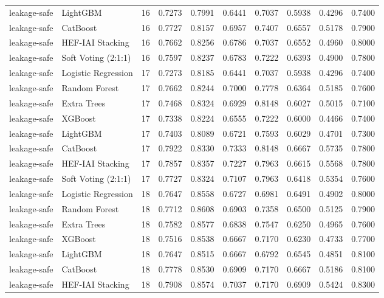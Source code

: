 \begin{tabular}{llrrrrrrrr}
leakage-safe & LightGBM & 16 & 0.7273 & 0.7991 & 0.6441 & 0.7037 & 0.5938 & 0.4296 & 0.7400 \\
leakage-safe & CatBoost & 16 & 0.7727 & 0.8157 & 0.6957 & 0.7407 & 0.6557 & 0.5178 & 0.7900 \\
leakage-safe & HEF-IAI Stacking & 16 & 0.7662 & 0.8256 & 0.6786 & 0.7037 & 0.6552 & 0.4960 & 0.8000 \\
leakage-safe & Soft Voting (2:1:1) & 16 & 0.7597 & 0.8237 & 0.6783 & 0.7222 & 0.6393 & 0.4900 & 0.7800 \\
leakage-safe & Logistic Regression & 17 & 0.7273 & 0.8185 & 0.6441 & 0.7037 & 0.5938 & 0.4296 & 0.7400 \\
leakage-safe & Random Forest & 17 & 0.7662 & 0.8244 & 0.7000 & 0.7778 & 0.6364 & 0.5185 & 0.7600 \\
leakage-safe & Extra Trees & 17 & 0.7468 & 0.8324 & 0.6929 & 0.8148 & 0.6027 & 0.5015 & 0.7100 \\
leakage-safe & XGBoost & 17 & 0.7338 & 0.8224 & 0.6555 & 0.7222 & 0.6000 & 0.4466 & 0.7400 \\
leakage-safe & LightGBM & 17 & 0.7403 & 0.8089 & 0.6721 & 0.7593 & 0.6029 & 0.4701 & 0.7300 \\
leakage-safe & CatBoost & 17 & 0.7922 & 0.8330 & 0.7333 & 0.8148 & 0.6667 & 0.5735 & 0.7800 \\
leakage-safe & HEF-IAI Stacking & 17 & 0.7857 & 0.8357 & 0.7227 & 0.7963 & 0.6615 & 0.5568 & 0.7800 \\
leakage-safe & Soft Voting (2:1:1) & 17 & 0.7727 & 0.8324 & 0.7107 & 0.7963 & 0.6418 & 0.5354 & 0.7600 \\
leakage-safe & Logistic Regression & 18 & 0.7647 & 0.8558 & 0.6727 & 0.6981 & 0.6491 & 0.4902 & 0.8000 \\
leakage-safe & Random Forest & 18 & 0.7712 & 0.8608 & 0.6903 & 0.7358 & 0.6500 & 0.5125 & 0.7900 \\
leakage-safe & Extra Trees & 18 & 0.7582 & 0.8577 & 0.6838 & 0.7547 & 0.6250 & 0.4965 & 0.7600 \\
leakage-safe & XGBoost & 18 & 0.7516 & 0.8538 & 0.6667 & 0.7170 & 0.6230 & 0.4733 & 0.7700 \\
leakage-safe & LightGBM & 18 & 0.7647 & 0.8515 & 0.6667 & 0.6792 & 0.6545 & 0.4851 & 0.8100 \\
leakage-safe & CatBoost & 18 & 0.7778 & 0.8530 & 0.6909 & 0.7170 & 0.6667 & 0.5186 & 0.8100 \\
leakage-safe & HEF-IAI Stacking & 18 & 0.7908 & 0.8574 & 0.7037 & 0.7170 & 0.6909 & 0.5424 & 0.8300 \\

\end{tabular}
